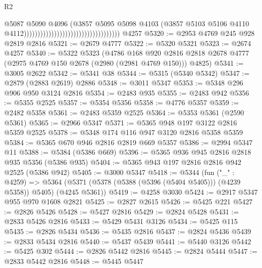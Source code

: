 \begin{lexlean}{R2}
\begin{coremodule}
                                                                      @5087
                                                                      @5090
                                                                      @4096
                                                                      (@3857
                                                                        @5095
                                                                        @5098
                                                                        @4103
                                                                        (@3857
                                                                          @5103
                                                                          @5106
                                                                          @4110
                                                                          @4112)))))))))))))))))))))))))))))))))))
    @4257
@5320 := @2953 @4769 @245 @928 @2819 @2816
@5321 := @2679 @4777
@5322 := @5320 @5321
@5323 := @2674 @4257
@5340 := @5322
    @5323
    (@4786
      @168
      @920
      @2816
      @2818
      @2678
      @4777
      (@2975 @4769 @150 @2678 (@2980 (@2981 @4769 @150)))
      @4825)
@5341 := @3005 @2622
@5342 := @5341 @38
@5344 := @5315 (@5340 @5342)
@5347 := @2879 (@2883 @2619) @2886
@5348 := @3011 @5347
@5353 := @5348 @296 @906 @950 @3124 @2816
@5354 := @2483 @935
@5355 := @2483 @942
@5356 := @5355 @2525
@5357 := @5354 @5356
@5358 := @4776 @5357
@5359 := @2482 @5358
@5361 := @2483 @5359 @2525
@5364 := @5353 @5361 (@2590 @5361)
@5365 := @2966 @5347
@5371 := @5365 @948 @197 @3122 @2816 @5359 @2525
@5378 := @5348 @174 @116 @947 @3120 @2816 @5358 @5359
@5384 := @5365 @670 @946 @2816 @2819 @669 @5357
@5386 := @2994 @5347 @11
@5388 := @5384 (@5386 @669)
@5396 := @5365 @936 @945 @2816 @2818 @935 @5356 (@5386 @935)
@5404 := @5365 @943 @197 @2816 @2816 @942 @2525 (@5386 @942)
@5405 := @3000 @5347
@5418 := @5344
    (fun ("_" : @4259) =>
    @5364 (@5371 (@5378 (@5388 (@5396 (@5404 @5405))) (@4239 @5358)) @5405) (@4245 @5361))
@5419 := @4258 @3030
@5424 := @2917 @5347 @955 @970 @1608 @2821
@5425 := @2827 @2615
@5426 := @5425 @221
@5427 := @2826 @5426
@5428 := @5427 @2816
@5429 := @2824 @5428
@5431 := @2833 @5426 @2816
@5433 := @5429 @5431 @3126
@5434 := @5425 @115
@5435 := @2826 @5434
@5436 := @5435 @2816
@5437 := @2824 @5436
@5439 := @2833 @5434 @2816
@5440 := @5437 @5439
@5441 := @5440 @3126
@5442 := @5425 @302
@5444 := @2826 @5442 @2816
@5445 := @2824 @5444
@5447 := @2833 @5442 @2816
@5448 := @5445 @5447

\end{coremodule}
\end{lexlean}
